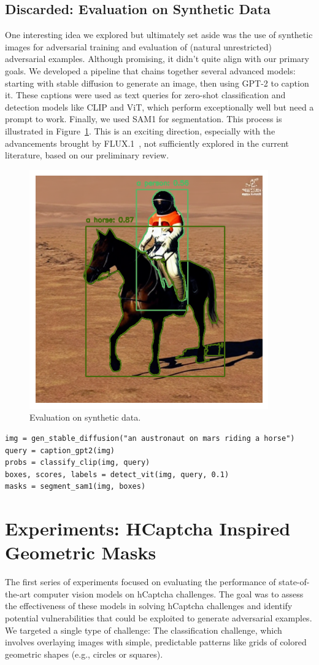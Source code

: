 \documentclass[a4paper, oneside]{discothesis}
\begin{document}
\subsection{Discarded: Evaluation on Synthetic Data}

One interesting idea we explored but ultimately set aside was the use of synthetic images for adversarial training and evaluation of (natural unrestricted) adversarial examples. Although promising, it didn't quite align with our primary goals. We developed a pipeline that chains together several advanced models: starting with stable diffusion to generate an image, then using GPT-2 to caption it. These captions were used as text queries for zero-shot classification and detection models like CLIP and ViT, which perform exceptionally well but need a prompt to work. Finally, we used SAM1 for segmentation. This process is illustrated in Figure~\ref{fig:chained}. This is an exciting direction, especially with the advancements brought by FLUX.1~\cite{BlackForestLabs2024FLUX}, not sufficiently explored in the current literature, based on our preliminary review.

\begin{figure}
	\centering
	\includegraphics[width=0.3\columnwidth]{figures/chained.png}
	\caption{Evaluation on synthetic data.}
	\label{fig:chained}
\end{figure}

\begin{verbatim}
img = gen_stable_diffusion("an austronaut on mars riding a horse")
query = caption_gpt2(img)
probs = classify_clip(img, query)
boxes, scores, labels = detect_vit(img, query, 0.1)
masks = segment_sam1(img, boxes)
\end{verbatim}

\section{Experiments: HCaptcha Inspired Geometric Masks}

The first series of experiments focused on evaluating the performance of state-of-the-art computer vision models on hCaptcha challenges. The goal was to assess the effectiveness of these models in solving hCaptcha challenges and identify potential vulnerabilities that could be exploited to generate adversarial examples. We targeted a single type of challenge: The classification challenge, which involves overlaying images with simple, predictable patterns like grids of colored geometric shapes (e.g., circles or squares).
\end{document}

